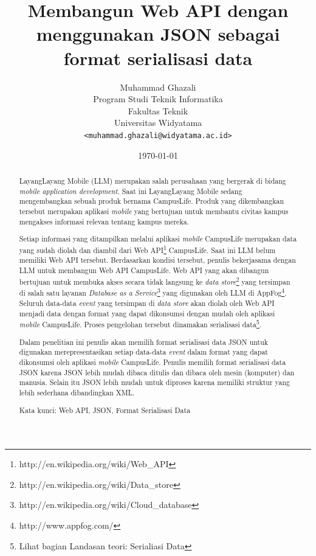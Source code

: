 \documentclass[a4paper, 12pt]{report}
\title{\textbf{Membangun Web API dengan menggunakan JSON sebagai format serialisasi data}}
\author{
Muhammad Ghazali\\
Program Studi Teknik Informatika\\
Fakultas Teknik\\
Universitas Widyatama
\\\texttt{<muhammad.ghazali@widyatama.ac.id>}
}
\date{\today}
\begin{document}
\maketitle

\onehalfspacing
\tableofcontents
\setcounter{tocdepth}{5}

\listoffigures

\listoftables

\begin{abstract}
\onehalfspacing LayangLayang Mobile (LLM) merupakan salah perusahaan yang bergerak di bidang \textit{mobile application development}. Saat ini LayangLayang Mobile sedang mengembangkan sebuah produk bernama CampusLife. Produk yang dikembangkan tersebut merupakan aplikasi \textit{mobile} yang bertujuan untuk membantu civitas kampus mengakses informasi relevan tentang kampus mereka.

\onehalfspacing Setiap informasi yang ditampilkan melalui aplikasi \textit{mobile} CampusLife merupakan data yang sudah diolah dan diambil dari Web API\footnote{http://en.wikipedia.org/wiki/Web\_API} CampusLife. Saat ini LLM belum memiliki Web API tersebut. Berdasarkan kondisi tersebut, penulis bekerjasama dengan LLM untuk membangun Web API CampusLife. Web API yang akan dibangun bertujuan untuk membuka akses secara tidak langsung ke \textit{data store}\footnote{http://en.wikipedia.org/wiki/Data\_store} yang tersimpan di salah satu layanan \textit{Database as a Service}\footnote{http://en.wikipedia.org/wiki/Cloud\_database} yang digunakan oleh LLM di AppFog\footnote{http://www.appfog.com/}. Seluruh data-data \textit{event} yang tersimpan di \textit{data store} akan diolah oleh Web API menjadi data dengan format yang dapat dikonsumsi dengan mudah oleh aplikasi \textit{mobile} CampusLife. Proses pengelohan tersebut dinamakan serialisasi data\footnote{Lihat bagian Landasan teori: Serialiasi Data}.

\onehalfspacing Dalam penelitian ini penulis akan memilih format serialisasi data JSON untuk digunakan merepresentasikan setiap data-data \textit{event} dalam format yang dapat dikonsumsi oleh aplikasi \textit{mobile} CampusLife. Penulis memilih format serialisasi data JSON karena JSON lebih mudah dibaca ditulis dan dibaca oleh mesin (komputer) dan manusia. Selain itu JSON lebih mudah untuk diproses karena memiliki struktur yang lebih sederhana dibandingkan XML\cite{json-fat-free}\cite{json-vs-xml-debate}.

\begin{flushleft}
\onehalfspacing Kata kunci: Web API, JSON, Format Serialisasi Data
\end{flushleft}

\end{abstract}
\end{document}

